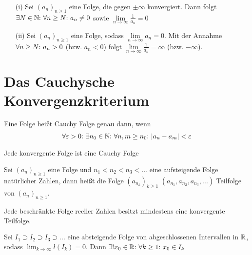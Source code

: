 \begin{framedthm}
	\begin{enumerate}
		\item[(i)] Sei $(a_n)_{n\geq 1}$ eine Folge, die gegen $\pm \infty$ konvergiert. Dann folgt $\exists N \in \mathbb{N}{:}\  \forall n \geq N{:}\  a_n \neq 0$ sowie $\lim\limits_{n \to \infty} \frac{1}{a_n} = 0$
		\item[(ii)] Sei $(a_n)_{n\geq 1}$ eine Folge, sodass $\lim\limits_{n \to \infty} a_n = 0$. Mit der Annahme $\forall n \geq N{:}\  a_n > 0$ (bzw. $a_n < 0$) folgt $\lim\limits_{n \to \infty} \frac{1}{a_n} = \infty$ (bzw. $-\infty$).
	\end{enumerate}
\end{framedthm}

\newpage
\section{Das Cauchysche Konvergenzkriterium}

\begin{frameddefn}
	Eine Folge heißt Cauchy Folge genau dann, wenn\begin{align*}
		\forall \varepsilon > 0{:}\  \exists n_0 \in \mathbb{N}{:}\  \forall n,m \geq n_0{:}\  |a_n - a_m| < \varepsilon
	\end{align*}
\end{frameddefn}


\begin{framedthm}
	Jede konvergente Folge ist eine Cauchy Folge
\end{framedthm}

\begin{frameddefn}[Teilfolgen]
	Sei $(a_n)_{n\geq 1}$ eine Folge und $n_1 < n_2 < n_3 < ...$ eine aufsteigende Folge natürlicher Zahlen, dann heißt die Folge $(a_{n_k})_{k \geq 1}$ $(a_{n_1}, a_{n_2}, a_{n_3}, ...)$ Teilfolge von $(a_n)_{n\geq 1}$.
\end{frameddefn}

\begin{framedthm}
	Jede beschränkte Folge reeller Zahlen besitzt mindestens eine konvergente Teilfolge.
\end{framedthm}

\begin{framedthm}
	Sei $I_1 \supset I_2 \supset I_3 \supset ...$ eine absteigende Folge von abgeschlossenen Intervallen in $\mathbb{R}$, sodass $\lim_{k \to \infty} l(I_k) = 0$. Dann $\exists! x_0 \in \mathbb{R}{:}\  \forall k \geq 1{:}\  x_0 \in I_k$
\end{framedthm}

